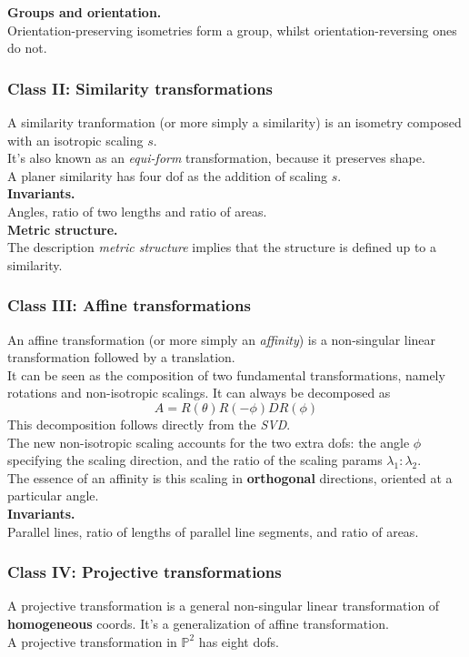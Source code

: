 \documentclass[12pt]{article}
\begin{document}
\noindent \textbf{Groups and orientation.} \\
Orientation-preserving isometries form a group, whilst orientation-reversing ones do not. 

\subsubsection{Class \textrm{II}: Similarity transformations}
A similarity tranformation (or more simply a similarity) is an isometry composed with an isotropic scaling $s$. \\
It's also known as an \textit{equi-form} transformation, because it preserves shape. \\
A planer similarity has four dof as the addition of scaling $s$. \\

\noindent \textbf{Invariants.} \\
Angles, ratio of two lengths and ratio of areas. \\

\noindent \textbf{Metric structure.} \\
The description \textit{metric structure} implies that the structure is defined up to a similarity. 

\subsubsection{Class \textrm{III}: Affine transformations}
An affine transformation (or more simply an \textit{affinity}) is a non-singular linear transformation 
followed by a translation. \\
It can be seen as the composition of two fundamental transformations, namely rotations and non-isotropic scalings. 
It can always be decomposed as $$A = R(\theta)R(-\phi)DR(\phi)$$ This decomposition follows directly from the \textit{SVD}. \\
The new non-isotropic scaling accounts for the two extra dofs: the angle $\phi$ specifying the scaling direction, 
and the ratio of the scaling params $\lambda_1 : \lambda_2$. \\
The essence of an affinity is this scaling in \textbf{orthogonal} directions, oriented at a particular angle. \\

\noindent \textbf{Invariants.} \\
Parallel lines, ratio of lengths of parallel line segments, and ratio of areas. 

\subsubsection{Class \textrm{IV}: Projective transformations} 
A projective transformation is a general non-singular linear transformation of \textbf{homogeneous} coords. 
It's a generalization of affine transformation. \\
A projective transformation in $\mathbb{P}^2$ has eight dofs. \\
\end{document}

